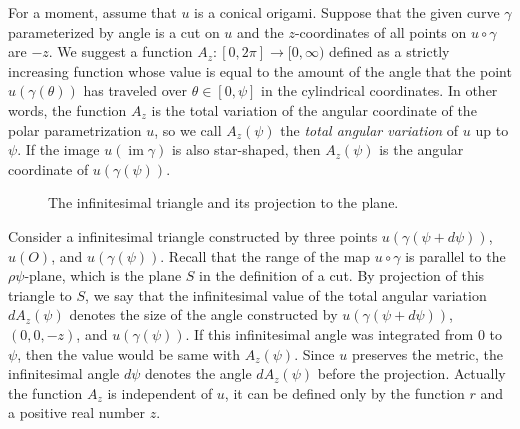 \documentclass{amsart}
\theoremstyle{plain}
\theoremstyle{definition}
\theoremstyle{remark}
\DeclareMathOperator{\im}{im}
\begin{document}
For a moment, assume that $u$ is a conical origami. %
Suppose that the given curve $\gamma$ parameterized by angle is a cut on $u$ and the $z$-coordinates of all points on $u\circ\gamma$ are $-z$. %
We suggest a function $A_z \colon [0,2\pi]\to[0,\infty)$ defined as a strictly increasing function whose value is equal to the amount of the angle that the point $u(\gamma(\theta))$ has traveled over $\theta\in[0,\psi]$ in the cylindrical coordinates.
In other words, the function $A_z$ is the total variation of the angular coordinate of the polar parametrization $u$, so we call $A_z(\psi)$ the \emph{total angular variation} of $u$ up to $\psi$.
If the image $u(\im \gamma)$ is also star-shaped, then $A_z(\psi)$ is the angular coordinate of $u(\gamma(\psi))$.

\begin{figure}%
\caption{The infinitesimal triangle and its projection to the plane.}
\end{figure}

Consider a infinitesimal triangle constructed by three points $u(\gamma(\psi+d\psi))$, $u(O)$, and $u(\gamma(\psi))$.
Recall that the range of the map $u\circ\gamma$ is parallel to the $\rho\psi$-plane, which is the plane $S$ in the definition of a cut. %
By projection of this triangle to $S$, we say that the infinitesimal value of the total angular variation $dA_z(\psi)$ denotes the size of the angle constructed by $u(\gamma(\psi+d\psi))$, $(0,0,-z)$, and $u(\gamma(\psi))$. %
If this infinitesimal angle was integrated from $0$ to $\psi$, then the value would be same with $A_z(\psi)$.
Since $u$ preserves the metric, the infinitesimal angle $d\psi$ denotes the angle $dA_z(\psi)$ before the projection.
Actually the function $A_z$ is independent of $u$, it can be defined only by the function $r$ and a positive real number $z$.
\end{document}
